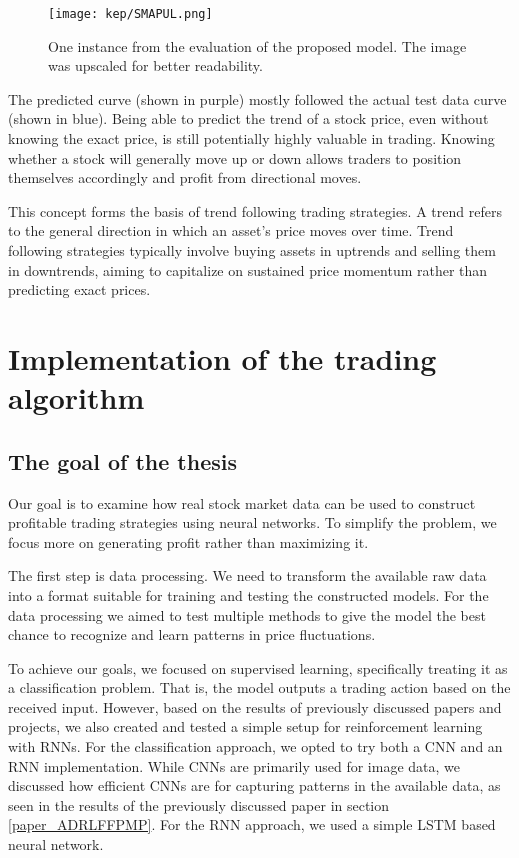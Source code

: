 \documentclass[a4paper,oneside,onecolumn,12pt]{book}
\begin{document}
	\begin{figure}[H]
	\begin{center}
		\texttt{[image: kep/SMAPUL.png]}
		\caption{One instance from the evaluation of the proposed model. The image was upscaled for better readability.}
		\label{fig:evalutaion_SMAPUL}
	\end{center}
	\end{figure}
	The predicted curve (shown in purple) mostly followed the actual test data curve (shown in blue). Being able to predict the trend of a stock price, even without knowing the exact price, is still potentially highly valuable in trading. Knowing whether a stock will generally move up or down allows traders to position themselves accordingly and profit from directional moves.

	This concept forms the basis of trend following trading strategies. A trend refers to the general direction in which an asset's price moves over time. Trend following strategies typically involve buying assets in uptrends and selling them in downtrends, aiming to capitalize on sustained price momentum rather than predicting exact prices. \cite{TFTSS}

\chapter{Implementation of the trading algorithm}

\section{The goal of the thesis}
	Our goal is to examine how real stock market data can be used to construct profitable trading strategies using neural networks. To simplify the problem, we focus more on generating profit rather than maximizing it.

	The first step is data processing. We need to transform the available raw data into a format suitable for training and testing the constructed models. For the data processing we aimed to test multiple methods to give the model the best chance to recognize and learn patterns in price fluctuations.

	To achieve our goals, we focused on supervised learning, specifically treating it as a classification problem. That is, the model outputs a trading action based on the received input. However, based on the results of previously discussed papers and projects, we also created and tested a simple setup for reinforcement learning with RNNs. For the classification approach, we opted to try both a CNN and an RNN implementation. While CNNs are primarily used for image data, we discussed how efficient CNNs are for capturing patterns in the available data, as seen in the results of the previously discussed paper in section \ref{paper_ADRLFFPMP}. For the RNN approach, we used a simple LSTM based neural network.
\end{document}
